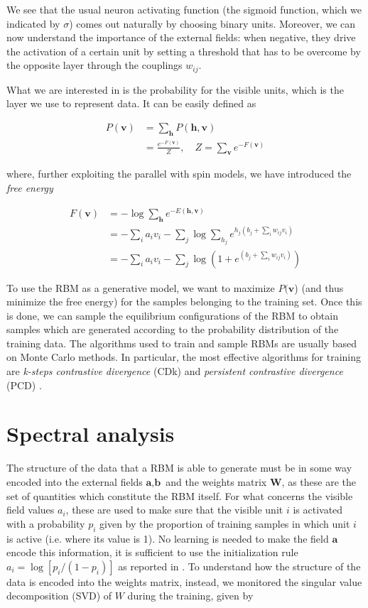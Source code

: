 \documentclass[twocolumn]{article}
\begin{document}
We see that the usual neuron activating function (the sigmoid function, which we indicated by \(\sigma\)) comes out naturally by choosing binary units. Moreover, we can now understand the importance of the external fields: when negative, they drive the activation of a certain unit by setting a threshold that has to be overcome by the opposite layer through the couplings \(w_{ij}\).

What we are interested in is the probability for the visible units, which is the layer we use to represent data. It can be easily defined as

\begin{align}
P(\textbf{v}) &  = \sum_{\textbf{h}} P(\textbf{h},\textbf{v}) \nonumber \\
& = \frac{e^{-F(\textbf{v})}}{Z}, \quad Z = \sum_{\textbf{v}} e^{-F(\textbf{v})}
\end{align}

where, further exploiting the parallel with spin models, we have introduced the \textit{free energy}

\begin{align}
F(\textbf{v}) & = -\log \sum_{\textbf{h}} e^{-E(\textbf{h},\textbf{v})} \nonumber \\
& = -\sum_i a_i v_i -\sum_j \log \sum_{h_j} e^{h_j \left( b_j + \sum_i w_{ij} v_i \right)} \nonumber \\
& = -\sum_i a_i v_i -\sum_j \log \left( 1 +  e^{\left( b_j + \sum_i w_{ij} v_i \right)} \right)
\end{align}

To use the RBM as a generative model, we want to maximize \(P(\textbf{v}\)) (and thus minimize the free energy) for the samples belonging to the training set. Once this is done, we can sample the equilibrium configurations of the RBM to obtain samples which are generated according to the probability distribution of the training data. The algorithms used to train and sample RBMs are usually based on Monte Carlo methods. In particular, the most effective algorithms for training are \textit{k-steps contrastive divergence} (CDk) \cite{Hinton_CD}  and \textit{persistent contrastive divergence} (PCD) \cite{PCD}. 

\section{Spectral analysis}
The structure of the data that a RBM  is able to generate must be in some way encoded into the external fields \(\textbf{a},\textbf{b}\) and the weights matrix \(\textbf{W}\), as these are the set of quantities which constitute the RBM itself. For what concerns the visible field values \(a_i\), these are used to make sure that the visible unit \(i\) is activated with a probability \(p_i\) given by the proportion of training samples in which unit \(i\) is active (i.e. where its value is 1). No learning is needed to make the field \(\textbf{a}\) encode this information, it is sufficient to use the initialization rule \(a_i = \log[p_i/(1-p_i)]\) as reported in \cite{Hinton_guide}. To understand how the structure of the data is encoded into the weights matrix, instead, we monitored the singular value decomposition (SVD) of \(W\) during the training, given by
\end{document}
